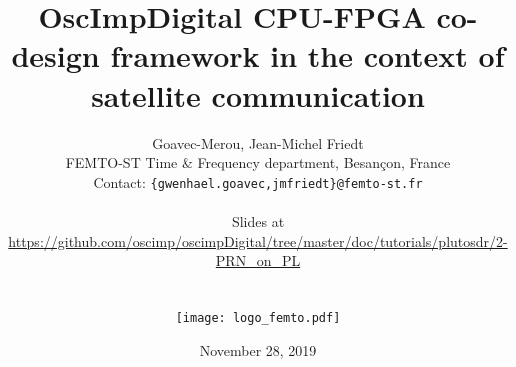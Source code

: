 \documentclass[compress,10pt]{beamer}
\begin{document}
\date{November 28, 2019}
\author[G. Goavec- Merou \& al.]{Goavec-Merou, Jean-Michel Friedt\\
{\footnotesize
FEMTO-ST Time \& Frequency department, Besan\c con, France \\ 
}
Contact: {\tt \{gwenhael.goavec,jmfriedt\}@femto-st.fr} \\ \vspace{0.6cm}
\begin{center}
Slides at \\
\url{https://github.com/oscimp/oscimpDigital/tree/master/doc/tutorials/plutosdr/2-PRN_on_PL}\\\ \\ \ \\
\texttt{[image: logo\_femto.pdf]}\vspace{-1cm}
\end{center}
}
\title[]{OscImpDigital CPU-FPGA co-design framework in the context of satellite communication}

\begin{frame}
\titlepage
\end{frame}


\end{document}
